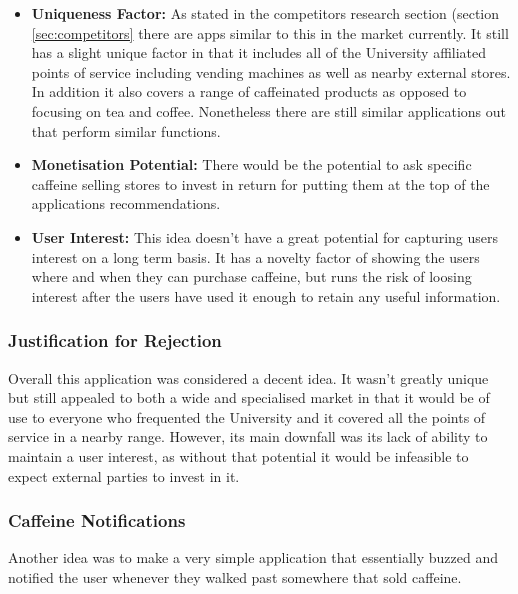 \begin{itemize}
	\item{\textbf{Uniqueness Factor:} As stated in the competitors research section (section \ref{sec:competitors} there are apps similar to this in the market currently. It still has a slight unique factor in that it includes all of the University affiliated points of service including vending machines as well as nearby external stores. In addition it also covers a range of caffeinated products as opposed to focusing on tea and coffee. Nonetheless there are still similar applications out that perform similar functions.}
	\item{\textbf{Monetisation Potential:} There would be the potential to ask specific caffeine selling stores to invest in return for putting them at the top of the applications recommendations.}
	\item{\textbf{User Interest:} This idea doesn't have a great potential for capturing users interest on a long term basis. It has a novelty factor of showing the users where and when they can purchase caffeine, but runs the risk of loosing interest after the users have used it enough to retain any useful information.}
\end{itemize}

\subsubsection{Justification for Rejection}
Overall this application was considered a decent idea. It wasn't greatly unique but still appealed to both a wide and specialised market in that it would be of use to everyone who frequented the University and it covered all the points of service in a nearby range. However, its main downfall was its lack of ability to maintain a user interest, as without that potential it would be infeasible to expect external parties to invest in it. 

\subsubsection{Caffeine Notifications}
Another idea was to make a very simple application that essentially buzzed and notified the user whenever they walked past somewhere that sold caffeine.

